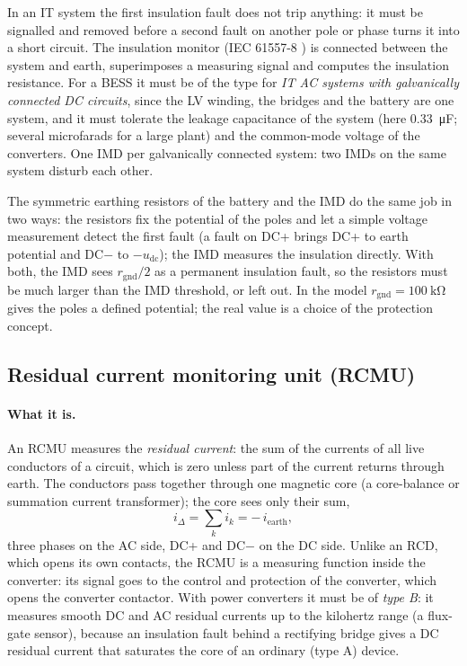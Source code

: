 \documentclass[11pt,a4paper]{scrartcl}
\newcommand{\ped}[1]{_{\mathrm{#1}}}
\begin{document}
\begin{onehalfspace}
In an IT system the first insulation fault does not trip anything: it must be signalled and removed before a second fault on another pole or phase turns it into a short circuit. The insulation monitor (IEC 61557-8 \cite{iec61557_8}) is connected between the system and earth, superimposes a measuring signal and computes the insulation resistance. For a BESS it must be of the type for \emph{IT AC systems with galvanically connected DC circuits}, since the LV winding, the bridges and the battery are one system, and it must tolerate the leakage capacitance of the system (here \SI{0.33}{\micro\farad}; several microfarads for a large plant) and the common-mode voltage of the converters. One IMD per galvanically connected system: two IMDs on the same system disturb each other.

The symmetric earthing resistors of the battery and the IMD do the same job in two ways: the resistors fix the potential of the poles and let a simple voltage measurement detect the first fault (a fault on DC+ brings DC+ to earth potential and DC$-$ to $-u\ped{dc}$); the IMD measures the insulation directly. With both, the IMD sees $r\ped{gnd}/2$ as a permanent insulation fault, so the resistors must be much larger than the IMD threshold, or left out. In the model $r\ped{gnd} = \SI{100}{\kilo\ohm}$ gives the poles a defined potential; the real value is a choice of the protection concept.

\subsection{Residual current monitoring unit (RCMU)}
\label{sec:rcmu}

\paragraph{What it is.} An RCMU measures the \emph{residual current}: the sum of the currents of all live conductors of a circuit, which is zero unless part of the current returns through earth. The conductors pass together through one magnetic core (a core-balance or summation current transformer); the core sees only their sum,
\begin{equation}
	i_\Delta = \sum_k i_k = -\,i\ped{earth},
	\label{eq:residual}
\end{equation}
three phases on the AC side, DC+ and DC$-$ on the DC side. Unlike an RCD, which opens its own contacts, the RCMU is a measuring function inside the converter: its signal goes to the control and protection of the converter, which opens the converter contactor. With power converters it must be of \emph{type B}: it measures smooth DC and AC residual currents up to the kilohertz range (a flux-gate sensor), because an insulation fault behind a rectifying bridge gives a DC residual current that saturates the core of an ordinary (type A) device.


\end{onehalfspace}
\end{document}
